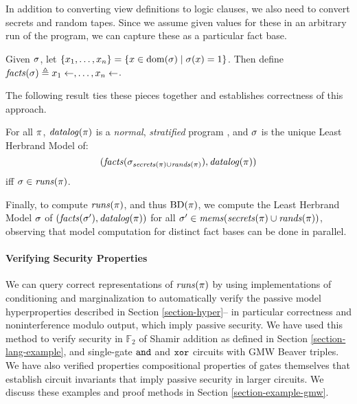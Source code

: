 In addition to converting view definitions to logic clauses, we also need to convert
secrets and random tapes. Since we assume given values for these in an arbitrary run of
the program, we can capture these as a particular fact base.
\begin{definition}
  Given $\sigma$, let $\{x_1,\ldots,x_n \} =
  \{ x \in \mathrm{dom}(\sigma) \mid \sigma(x) = 1 \}$.
  Then define $\mathit{facts}(\sigma) \triangleq x_1 \gets, \ldots, x_n \gets$.
\end{definition}
The following result ties these pieces together and establishes
correctness of this approach.
\begin{lemma}
  For all $\pi$, 
  $\mathit{datalog}(\pi)$ is a \emph{normal}, \emph{stratified}
  program \cite{aspis2018linear}, and $\sigma$ is the unique Least Herbrand
  Model of: $$(\mathit{facts}(\sigma_{\mathit{secrets}(\pi) \cup \mathit{rands}(\pi)}),\mathit{datalog}(\pi))$$
  iff $\sigma \in \mathit{runs}(\pi)$.
\end{lemma}
Finally, to compute $\mathit{runs}(\pi)$, and thus $\mathrm{BD}(\pi)$, we compute
the Least Herbrand Model $\sigma$ of $(\mathit{facts}(\sigma'),\mathit{datalog}(\pi))$
for all $\sigma' \in \mathit{mems}(\mathit{secrets}(\pi) \cup \mathit{rands}(\pi))$, observing
that model computation for distinct fact bases can be done in parallel. 

\paragraph{Verifying Security Properties} We can
query correct representations of $\mathit{runs}(\pi)$ by using
implementations of conditioning and marginalization to automatically
verify the passive model hyperproperties described in Section
\ref{section-hyper}-- in particular correctness and noninterference
modulo output, which imply passive security.  We have used this method
to verify security in $\mathbb{F}_2$ of Shamir addition as defined in Section
\ref{section-lang-example}, and single-gate $\texttt{and}$ and $\texttt{xor}$ circuits with GMW
Beaver triples. We have also
verified properties compositional properties of gates themselves that establish
circuit invariants that imply passive security in larger circuits.
We discuss these examples and proof methods in Section
\ref{section-example-gmw}.


